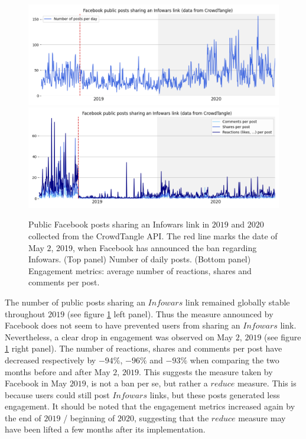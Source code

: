 \documentclass{article}
\begin{document}
\begin{figure}[h]
	\centering
	
		\includegraphics[scale=0.25]{../figure/facebook_crowdtangle_infowars_1.png}
		\includegraphics[scale=0.25]{../figure/facebook_crowdtangle_infowars_2.png} 
	
	\caption{Public Facebook posts sharing an Infowars link in $2019$ and $2020$ collected from the CrowdTangle API. The red line marks the date of May $2$, 2019, when Facebook has announced the ban regarding Infowars. (Top panel) Number of daily posts. (Bottom panel) Engagement metrics: average number of reactions, shares and comments per post. }
	\label{infowars1}
\end{figure}

The number of public posts sharing an $Infowars$ link remained globally stable throughout $2019$ (see figure \ref{infowars1} left panel). 
Thus the measure announced by Facebook does not seem to have prevented users from sharing an $Infowars$ link. Nevertheless, a clear drop in engagement was observed on May $2$, $2019$ (see figure \ref{infowars1} right panel). 
The number of reactions, shares and comments per post have decreased respectively  by $-94\%$,  $-96\%$ and $-93\%$  when comparing the two months before and after May $2$, $2019$. This suggests the measure taken by Facebook in May $2019$, is not a ban per se, but rather a $reduce$ measure. This is because users could still post $Infowars$ links, but these posts generated less engagement. It should be noted that the engagement metrics increased again by the end of $2019$ / beginning of $2020$, suggesting that the $reduce$ measure may have been lifted a few months after its implementation.
\end{document}
